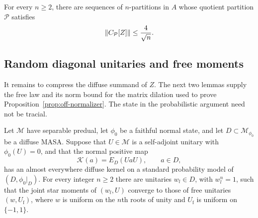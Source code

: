 \begin{proposition}\label{prop:off-normalizer}
For every $n\geq2$, there are sequences of $n$-partitions in $A$
whose quotient partition $\mathcal P$ satisfies
\begin{equation}\label{exp:off-normalizer-bound}
 \left\lVert C_{\mathcal P}[Z]\right\rVert\leq\frac4{\sqrt n}.
\end{equation}
\end{proposition}



\subsection{Random diagonal unitaries and free moments}

It remains to compress the diffuse summand of $Z$.
The next two lemmas supply the free law and its norm bound for the
matrix dilation used to prove Proposition~\ref{prop:off-normalizer}.
The state in the probabilistic argument need not be tracial.

\begin{lemma}\label{lem:random-freeness}
Let $\mathcal M$ have separable predual, let $\phi_0$ be a faithful
normal state, and let $D\subset\mathcal M_{\phi_0}$ be a diffuse MASA.
Suppose that $U\in\mathcal M$ is a self-adjoint unitary with
$\phi_0(U)=0$, and that the normal positive map
\[
 \mathcal K(a)=E_D(UaU),\qquad a\in D,
\]
has an almost everywhere diffuse kernel on a standard probability
model of $(D,\phi_0|_D)$. For every integer $n\geq2$ there are unitaries
$w_l\in D$, with $w_l^n=1$, such that the joint star moments of
$(w_l,U)$ converge to those of free unitaries $(w,U_{\mathrm f})$,
where $w$ is uniform on the $n$th roots of unity and $U_{\mathrm f}$
is uniform on $\{-1,1\}$.
\end{lemma}

